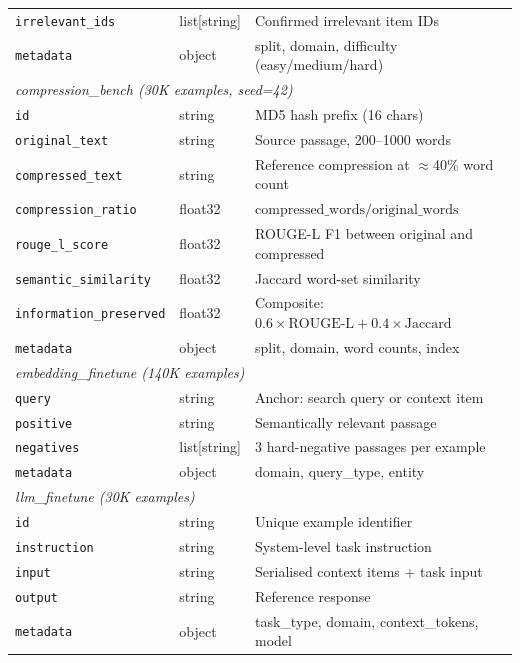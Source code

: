 \begin{table}[h!]
\begin{tabular}{@{}llp{6cm}@{}}
\texttt{irrelevant\_ids}  & list[string] & Confirmed irrelevant item IDs \\
\texttt{metadata}         & object       & split, domain, difficulty (easy/medium/hard) \\
\midrule
\multicolumn{3}{l}{\textit{compression\_bench (30K examples, seed=42)}} \\
\midrule
\texttt{id}               & string       & MD5 hash prefix (16 chars) \\
\texttt{original\_text}   & string       & Source passage, 200--1000 words \\
\texttt{compressed\_text} & string       & Reference compression at $\approx$40\% word count \\
\texttt{compression\_ratio} & float32    & $\text{compressed\_words} / \text{original\_words}$ \\
\texttt{rouge\_l\_score}  & float32      & ROUGE-L F1 between original and compressed \\
\texttt{semantic\_similarity} & float32  & Jaccard word-set similarity \\
\texttt{information\_preserved} & float32 & Composite: $0.6 \times \text{ROUGE-L} + 0.4 \times \text{Jaccard}$ \\
\texttt{metadata}         & object       & split, domain, word counts, index \\
\midrule
\multicolumn{3}{l}{\textit{embedding\_finetune (140K examples)}} \\
\midrule
\texttt{query}            & string       & Anchor: search query or context item \\
\texttt{positive}         & string       & Semantically relevant passage \\
\texttt{negatives}        & list[string] & 3 hard-negative passages per example \\
\texttt{metadata}         & object       & domain, query\_type, entity \\
\midrule
\multicolumn{3}{l}{\textit{llm\_finetune (30K examples)}} \\
\midrule
\texttt{id}               & string       & Unique example identifier \\
\texttt{instruction}      & string       & System-level task instruction \\
\texttt{input}            & string       & Serialised context items + task input \\
\texttt{output}           & string       & Reference response \\
\texttt{metadata}         & object       & task\_type, domain, context\_tokens, model \\
\bottomrule
\end{tabular}
\end{table}


